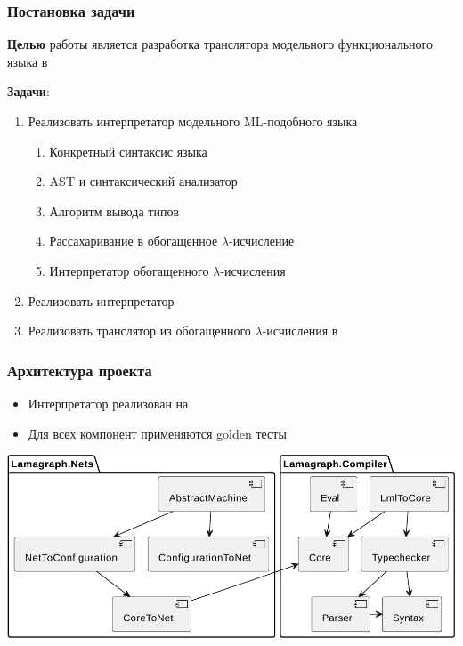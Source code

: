 \documentclass
  [ russian
  , aspectratio=169 %
  ] {beamer}
\begin{document}
\begin{frame}
    \frametitle{Постановка задачи}

    \textbf{Целью} работы является разработка транслятора модельного функционального языка в \INs{}
    \vspace{1em}

    \textbf{Задачи}:
    \begin{enumerate}
        \item Реализовать интерпретатор модельного ML-подобного языка
              \begin{enumerate}
                  \item Конкретный синтаксис языка
                  \item AST и синтаксический анализатор
                  \item Алгоритм вывода типов
                  \item Рассахаривание в обогащенное $\lambda$-исчисление
                  \item Интерпретатор обогащенного $\lambda$-исчисления
              \end{enumerate}
        \item Реализовать интерпретатор \INs{}
        \item Реализовать транслятор из обогащенного $\lambda$-исчисления в \INs{}
    \end{enumerate}

\end{frame}

\begin{frame}
    \frametitle{Архитектура проекта}

    \begin{itemize}
        \item Интерпретатор реализован на \Haskell{}
        \item Для всех компонент применяются golden тесты
    \end{itemize}

    \begin{center}
        \includegraphics[width=0.9\linewidth]{figures/components.pdf}
    \end{center}

\end{frame}
\end{document}
